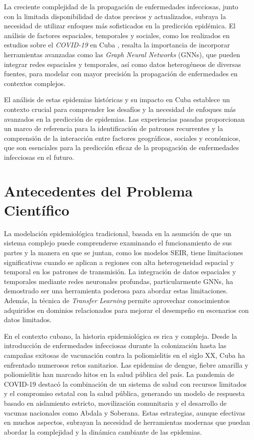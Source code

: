 La creciente complejidad de la propagación de enfermedades infecciosas, junto con la limitada disponibilidad de datos precisos y actualizados, subraya la necesidad de utilizar enfoques más sofisticados en la predicción epidémica. El análisis de factores espaciales, temporales y sociales, como los realizados en estudios sobre el \textit{COVID-19} en Cuba \textcite{covid-cuba-2020}, resalta la importancia de incorporar herramientas avanzadas como las \textit{Graph Neural Networks} (GNNs), que pueden integrar redes espaciales y temporales, así como datos heterogéneos de diversas fuentes, para modelar con mayor precisión la propagación de enfermedades en contextos complejos.

El análisis de estas epidemias históricas y su impacto en Cuba establece un contexto crucial para comprender los desafíos y la necesidad de enfoques más avanzados en la predicción de epidemias. Las experiencias pasadas proporcionan un marco de referencia para la identificación de patrones recurrentes y la comprensión de la interacción entre factores geográficos, sociales y económicos, que son esenciales para la predicción eficaz de la propagación de enfermedades infecciosas en el futuro.

\section*{Antecedentes del Problema Científico}
La modelación epidemiológica tradicional, basada en la asumción de que un sistema complejo puede comprenderse examinando el funcionamiento de sus partes y la manera en que se juntan, como los modelos SEIR, tiene limitaciones significativas cuando se aplican a regiones con alta heterogeneidad espacial y temporal en los patrones de transmisión. La integración de datos espaciales y temporales mediante redes neuronales profundas, particularmente GNNs, ha demostrado ser una herramienta poderosa para abordar estas limitaciones. Además, la técnica de \textit{Transfer Learning} permite aprovechar conocimientos adquiridos en dominios relacionados para mejorar el desempeño en escenarios con datos limitados.

En el contexto cubano, la historia epidemiológica es rica y compleja. Desde la introducción de enfermedades infecciosas durante la colonización hasta las campañas exitosas de vacunación contra la poliomielitis en el siglo XX, Cuba ha enfrentado numerosos retos sanitarios. Las epidemias de dengue, fiebre amarilla y poliomielitis han marcado hitos en la salud pública del país. La pandemia de COVID-19 destacó la combinación de un sistema de salud con recursos limitados y el compromiso estatal con la salud pública, generando un modelo de respuesta basado en aislamiento estricto, movilización comunitaria y el desarrollo de vacunas nacionales como Abdala y Soberana. Estas estrategias, aunque efectivas en muchos aspectos, subrayan la necesidad de herramientas modernas que puedan abordar la complejidad y la dinámica cambiante de las epidemias.

